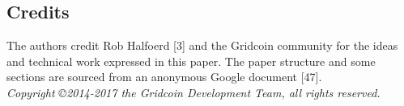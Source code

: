 \subsection{Credits}
\label{sec:credits}
The authors credit Rob Halfoerd [3] and the Gridcoin community for the ideas and technical work expressed in this paper. The paper structure and some sections are sourced from an anonymous Google document [47].\\

\medskip
\textit{Copyright \copyright  2014-2017 the Gridcoin Development Team, all rights reserved.}